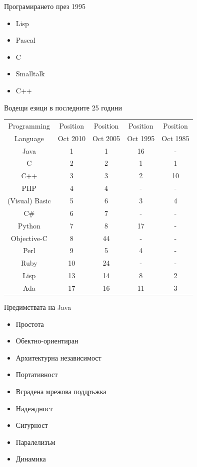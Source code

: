 \documentclass{beamer}
\begin{document}
\begin{frame}{Програмирането през 1995}
  \transdissolve
  \begin{itemize}
    \item Lisp
    \item Pascal
    \item C
    \item Smalltalk
    \item C++
  \end{itemize}
\end{frame}

\begin{frame}{Водещи езици в последните 25 години}
  \transdissolve
  \begin{tabular}{|c|c|c|c|c|}
    \hline
    Programming & Position & Position & Position & Position \\
    Language    & Oct 2010 & Oct 2005 & Oct 1995 & Oct 1985 \\
    \hline
    \hline
    Java        & 1        & 1        & 16       & -        \\
    \hline
    C           & 2        & 2        & 1        & 1        \\
    \hline
    C++         & 3        & 3        & 2        & 10       \\
    \hline
    PHP         & 4        & 4        & -        & -        \\
    \hline   
    (Visual) Basic & 5     & 6        & 3        & 4        \\
    \hline
    C\#         & 6        & 7        & -        & -        \\
    \hline
    Python      & 7        & 8        & 17       & -        \\
    \hline
    Objective-C & 8        & 44       & -        & -        \\
    \hline
    Perl        & 9        & 5        & 4        & -        \\
    \hline      
    Ruby        & 10       & 24       & -        & -        \\
    \hline 
    Lisp        & 13       & 14       & 8        & 2        \\
    \hline
    Ada         & 17       & 16       & 11       & 3        \\
    \hline
  \end{tabular}
\end{frame}

\begin{frame}{Предимствата на Java}
  \transdissolve
  \begin{itemize}
  \item Простота
  \item Обектно-ориентиран
  \item Архитектурна независимост
  \item Портативност
  \item Вградена мрежова поддръжка
  \item Надеждност
  \item Сигурност
  \item Паралелизъм
  \item Динамика
  \end{itemize}
\end{frame}
\end{document}
